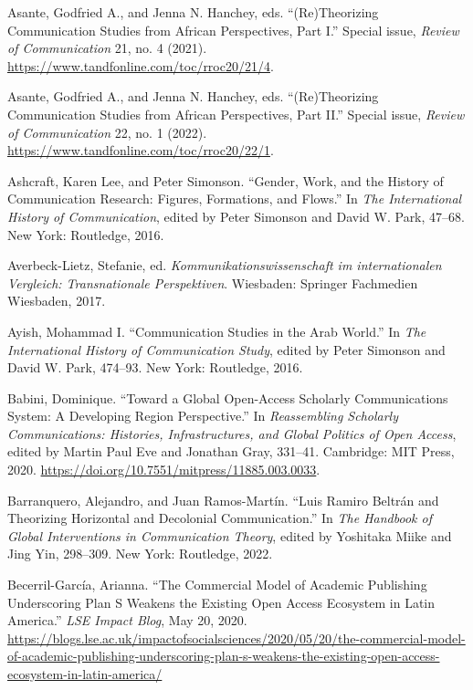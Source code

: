 \documentclass{tufte-handout}
\begin{document}
\begin{hangparas}{.25in}{1}
Asante, Godfried A., and Jenna N. Hanchey, eds. ``(Re)Theorizing
Communication Studies from African Perspectives, Part I.'' Special
issue, \emph{Review of Communication} 21, no. 4 (2021).
\url{https://www.tandfonline.com/toc/rroc20/21/4}.

Asante, Godfried A., and Jenna N. Hanchey, eds. ``(Re)Theorizing
Communication Studies from African Perspectives, Part II.'' Special
issue, \emph{Review of Communication} 22, no. 1 (2022).
\url{https://www.tandfonline.com/toc/rroc20/22/1}.

Ashcraft, Karen Lee, and Peter Simonson. ``Gender, Work, and the History
of Communication Research: Figures, Formations, and Flows.'' In
\emph{The International History of Communication}, edited by Peter
Simonson and David W. Park, 47--68. New York: Routledge, 2016.

Averbeck-Lietz, Stefanie, ed. \emph{Kommunikationswissenschaft im
internationalen Vergleich: Transnationale Perspektiven}. Wiesbaden:
Springer Fachmedien Wiesbaden, 2017.

Ayish, Mohammad I. ``Communication Studies in the Arab World.'' In
\emph{The International History of Communication Study}, edited by Peter
Simonson and David W. Park, 474--93. New York: Routledge, 2016.

Babini, Dominique. ``Toward a Global Open-Access Scholarly
Communications System: A Developing Region Perspective.'' In
\emph{Reassembling Scholarly Communications: Histories, Infrastructures,
and Global Politics of Open Access}, edited by Martin Paul Eve and
Jonathan Gray, 331--41. Cambridge: MIT Press, 2020.
\url{https://doi.org/10.7551/mitpress/11885.003.0033}.

Barranquero, Alejandro, and Juan Ramos-Martín. ``Luis Ramiro Beltrán and
Theorizing Horizontal and Decolonial Communication.'' In \emph{The
Handbook of Global Interventions in Communication Theory}, edited by
Yoshitaka Miike and Jing Yin, 298--309. New York: Routledge, 2022.

Becerril-García, Arianna. ``The Commercial Model of Academic Publishing
Underscoring Plan S Weakens the Existing Open Access Ecosystem in Latin
America.'' \emph{LSE Impact Blog}, May 20, 2020.
\href{https://blogs.lse.ac.uk/impactofsocialsciences/2020/05/20/the-commercial-model-of-academic-publishing-underscoring-plan-s-weakens-the-existing-open-access-ecosystem-in-latin-america/}{https://blogs.lse.ac.uk/impactofsocialsciences/2020/05/20/the-commercial-model-of-academic-publishing-underscoring-plan-s-weakens-the-existing-open-access-ecosystem-in-latin-america/}


\end{hangparas}
\end{document}
